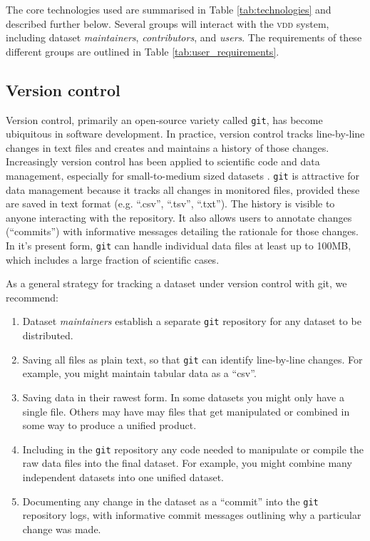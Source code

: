 \documentclass[a4paper,11pt]{article}
\begin{document}
The core technologies used are summarised in Table \ref{tab:technologies} and described further below. Several groups will interact with the \textsc{vdd} system, including dataset \emph{maintainers}, \emph{contributors}, and \emph{users}. The requirements of these different groups are outlined in Table \ref{tab:user_requirements}.

\subsection{Version control}

Version control, primarily an open-source variety called \texttt{git}, has become ubiquitous in software development. In practice, version control tracks line-by-line changes in text files and creates and maintains a history of those changes. Increasingly version control has been applied to scientific code and data management, especially for small-to-medium sized datasets \citep{Ram-2013, Perkel-2016, Lowndes-2017}. \texttt{git} is attractive for data management because it tracks all changes in monitored files, provided these are saved in text format (e.g. ``.csv'', ``.tsv'', ``.txt''). The history is visible to anyone interacting with the repository. It also allows users to annotate changes (``commits'') with informative messages detailing the rationale for those changes. In it's present form, \texttt{git} can handle individual data files at least up to 100MB, which includes a large fraction of scientific cases.

As a general strategy for tracking a dataset under version control with git, we recommend:
\begin{enumerate}
  \item Dataset \emph{maintainers} establish a separate \texttt{git} repository for any dataset to be distributed.
  \item Saving all files as plain text, so that \texttt{git} can identify line-by-line changes. For example, you might maintain tabular data as a ``csv''.
  \item Saving data in their rawest form. In some datasets you might only have a single file. Others may have may files that get manipulated or combined in some way to produce a unified product.
  \item Including in the \texttt{git} repository any code needed to manipulate or compile the raw data files into the final dataset. For example, you might combine many independent datasets into one unified dataset.
  \item Documenting any change in the dataset as a ``commit'' into the \texttt{git} repository logs, with informative commit messages outlining why a particular change was made.
\end{enumerate}
\end{document}
